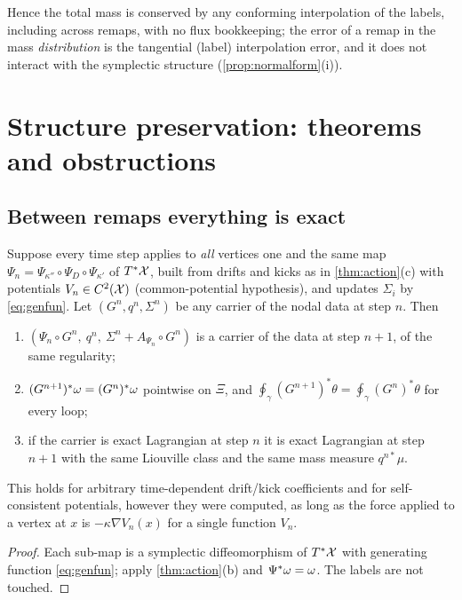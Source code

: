 Hence the total mass is conserved by any conforming interpolation of the labels, including across remaps, with no
flux bookkeeping; the error of a remap in the mass \emph{distribution} is the tangential (label) interpolation
error, and it does not interact with the symplectic structure (\cref{prop:normalform}(i)).

\section{Structure preservation: theorems and obstructions}\label{sec:structure}

\subsection{Between remaps everything is exact}

\begin{theorem}\label{thm:carrier}
Suppose every time step applies to \emph{all} vertices one and the same map
$\Psi_n=\Psi_{\kappa''}\circ\Psi_D\circ\Psi_{\kappa'}$ of $T^*\mathcal{X}$, built from drifts and kicks as in
\cref{thm:action}(c) with potentials $V_n\in C^{2}(\mathcal{X})$ \textup{(common-potential hypothesis)}, and updates
$\Sigma_i$ by \eqref{eq:genfun}. Let $(G^n,q^n,\Sigma^n)$ be any carrier of the nodal data at step $n$. Then
\begin{enumerate}[label=(\roman*),leftmargin=2.2em,itemsep=1pt]
\item $(\Psi_n\circ G^n,\ q^n,\ \Sigma^n+A_{\Psi_n}\circ G^n)$ is a carrier of the data at step $n+1$, of the same regularity;
\item $(G^{n+1})^*\omega=(G^n)^*\omega$ pointwise on $\Xi$, and $\oint_\gamma(G^{n+1})^*\theta=\oint_\gamma(G^n)^*\theta$ for every loop;
\item if the carrier is exact Lagrangian at step $n$ it is exact Lagrangian at step $n+1$ with the same Liouville class and the same mass measure $q^{n*}\mu$.
\end{enumerate}
This holds for arbitrary time-dependent drift/kick coefficients and for self-consistent potentials, however they
were computed, as long as the force applied to a vertex at $x$ is $-\kappa\nabla V_n(x)$ for a single function $V_n$.
\end{theorem}
\begin{proof}
Each sub-map is a symplectic diffeomorphism of $T^*\mathcal{X}$ with generating function \eqref{eq:genfun}; apply
\cref{thm:action}(b) and $\Psi^*\omega=\omega$. The labels are not touched.
\end{proof}

